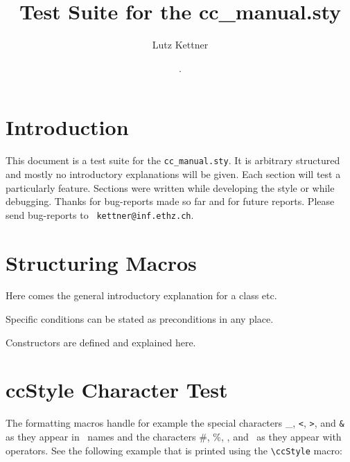\documentclass[12pt]{article}
\title {Test Suite for the cc\_manual.sty}
\author{Lutz Kettner}
\date{\ccRevision. \ccDate}
\begin{document}
\maketitle

\section{Introduction}

This document is a test suite for the {\tt cc\_manual.sty}. It is
arbitrary structured and mostly no introductory explanations will be given.
Each section will test a particularly feature. Sections were written
while developing the style or while debugging. Thanks for bug-reports
made so far and for future reports. Please send bug-reports to {\tt
  kettner@inf.ethz.ch}.


\section{Structuring Macros}

\ccDefinition Here comes the general introductory explanation for a
class etc.

\ccPrecond Specific conditions can be stated as preconditions in any place.

\ccCreation Constructors are defined and explained here.

\section{ccStyle Character Test}

The formatting macros handle for example the special characters \_,
{\tt <}, {\tt >}, and {\tt \&} as they appear in \CC\ names and the
characters \#, \%, \ccHat, and \ccTilde\ as they appear with
operators. See the following example that is printed using the
{\verb+\cc+}{\tt Style} macro:
\end{document}

